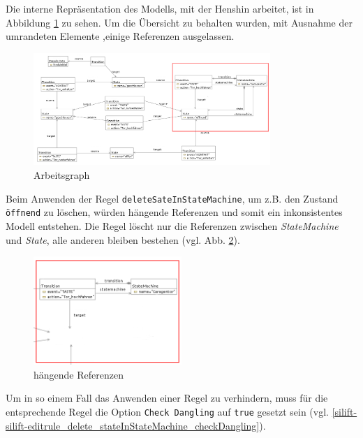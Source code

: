 Die interne Repräsentation des Modells, mit der Henshin arbeitet, ist in Abbildung \ref{henshin_workinggraph_garagedoor} zu sehen. 
Um die Übersicht zu behalten wurden, mit Ausnahme der umrandeten Elemente ,einige Referenzen ausgelassen.  

\begin{figure}[H]
\centering
\includegraphics[width=0.8\textwidth]{editrules/graphics/henshin-workinggraph_garagedoor.png}
\caption{Arbeitsgraph}
\label{henshin_workinggraph_garagedoor}
\end{figure}

Beim Anwenden der Regel \texttt{deleteSateInStateMachine}, um z.B. den Zustand \texttt{öffnend} zu löschen, würden hängende Referenzen und somit ein inkonsistentes Modell entstehen. Die Regel löscht nur die Referenzen zwischen \textit{StateMachine} und \textit{State}, alle anderen bleiben bestehen (vgl. Abb. \ref{henshin_workinggraph_garagedoor_danglingEdges}). 

\begin{figure}[H]
\centering
\includegraphics[width=0.5\textwidth]{editrules/graphics/henshin-workinggraph_garagedoor_danglingEdges.png}
\caption{hängende Referenzen}
\label{henshin_workinggraph_garagedoor_danglingEdges}
\end{figure}

Um in so einem Fall das Anwenden einer Regel zu verhindern, muss für die entsprechende Regel die Option \texttt{Check Dangling} auf \texttt{true} gesetzt sein (vgl. \ref{silift-silift-editrule_delete_stateInStateMachine_checkDangling}).\\

